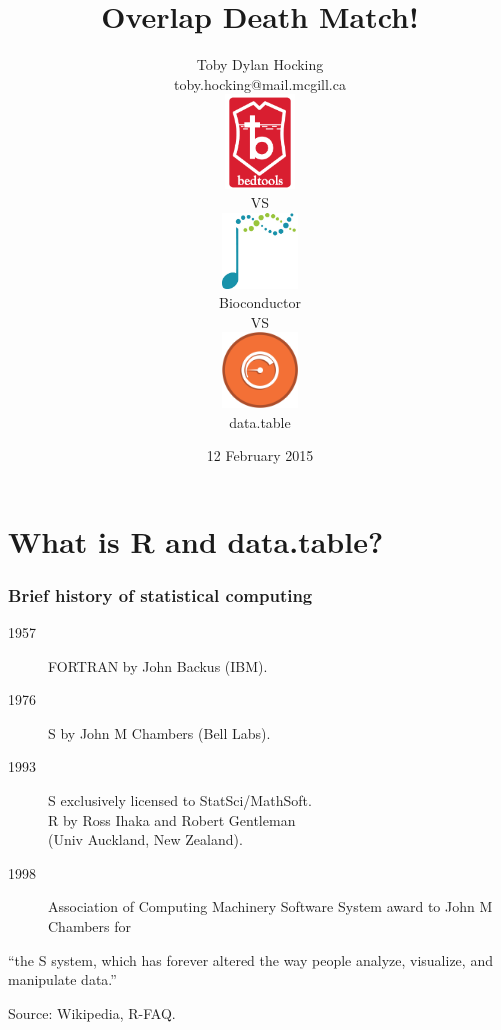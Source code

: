 \documentclass{beamer}
\begin{document}
\title{Overlap Death Match!}

\author{
  Toby Dylan Hocking\\
  toby.hocking@mail.mcgill.ca
\vskip 0.5cm
\parbox{2cm}{
  \includegraphics[height=2.5cm]{bedtools} 
}
VS 
\parbox{2cm}{
  \centering
  \includegraphics[height=2cm]{bioconductor}
  \\
  Bioconductor
}
VS
\parbox{2cm}{
  \centering
  \includegraphics[height=2cm]{datatable} 
  \\
  data.table
}
}

\date{12 February 2015}

\maketitle


\section{What is R and data.table?}

\begin{frame}
  \frametitle{Brief history of statistical computing}
  \begin{description}
  \item[1957] FORTRAN by John Backus (IBM).
  \item[1976] S by John M Chambers (Bell Labs).
  \item[1993] S exclusively licensed to StatSci/MathSoft.\\
    R by Ross Ihaka and Robert Gentleman\\
    (Univ Auckland, New Zealand).
  \item[1998] Association of Computing Machinery 
    Software System award
    to John M Chambers for
  \end{description}
  ``the S system, which has forever altered the way people analyze,
  visualize, and manipulate data.''
  
  \vskip 0.5cm Source: Wikipedia, R-FAQ.
\end{frame}
\end{document}
